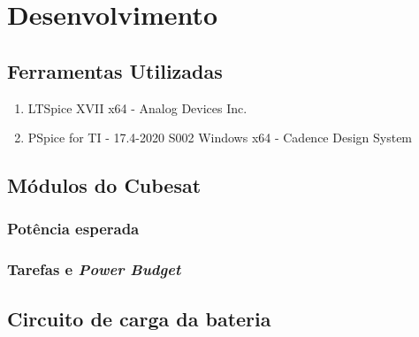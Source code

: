 \chapter{Desenvolvimento} \label{desenvolvimento}

\section{Ferramentas Utilizadas}
\begin{enumerate}
    \item LTSpice XVII x64 - Analog Devices Inc.
    \item PSpice\textsuperscript{\textregistered} for TI - 17.4-2020 S002 Windows x64 - Cadence Design System
\end{enumerate}

\section{Módulos do Cubesat}
\subsection{Potência esperada}
\subsection{Tarefas e \textit{Power Budget}}

\section{Circuito de carga da bateria}




